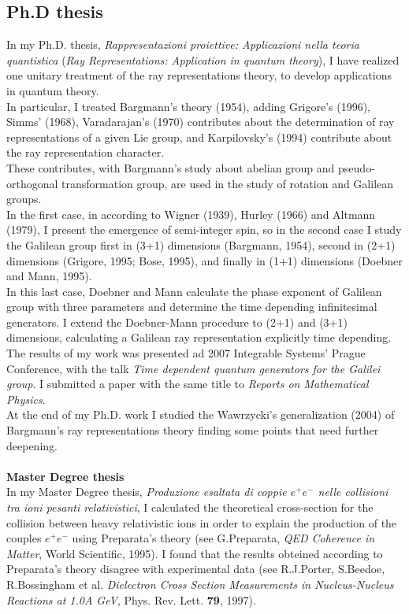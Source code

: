 \subsection*{Ph.D thesis}
In my Ph.D. thesis, {\em Rappresentazioni proiettive: Applicazioni nella teoria quantistica} ({\em Ray Representations: Application in quantum theory}), I have realized one unitary treatment of the ray representations theory, to develop applications in quantum theory.\\
In particular, I treated Bargmann's theory (1954), adding Grigore's (1996), Simms' (1968), Varadarajan's (1970) contributes about the determination of ray representations of a given Lie group, and Karpilovsky's (1994) contribute about the ray representation character.\\
These contributes, with Bargmann's study about abelian group and pseudo-orthogonal transformation group, are used in the study of rotation and Galilean groups.\\
In the first case, in according to Wigner (1939), Hurley (1966) and Altmann (1979), I present the emergence of semi-integer spin, so in the second case I study the Galilean group first in (3+1) dimensions (Bargmann, 1954), second in (2+1) dimensions (Grigore, 1995; Bose, 1995), and finally in (1+1) dimensions (Doebner and Mann, 1995).\\ 
In this last case, Doebner and Mann calculate the phase exponent of Galilean group with three parameters and determine the time depending infinitesimal generators. I extend the Doebner-Mann procedure to (2+1) and (3+1) dimensions, calculating a Galilean ray representation explicitly time depending.\\
The results of my work was presented ad 2007 Integrable Systems' Prague Conference, with the talk {\em Time dependent quantum generators for the Galilei group}. I submitted a paper with the same title to {\em Reports on Mathematical Physics}.\\
At the end of my Ph.D. work I studied the Wawrzycki's generalization (2004) of Bargmann's ray representations theory finding some points that need further deepening.\\\\
{\bf Master Degree thesis}\\
In my Master Degree thesis, {\em Produzione esaltata di coppie $e^+ e^-$ nelle collisioni tra ioni pesanti relativistici}, I calculated the theoretical cross-section for the collision between heavy relativistic ions in order to explain the production of the couples $e^+ e^-$ using Preparata's theory (see G.Preparata, {\em QED Coherence in Matter}, World Scientific, 1995). I found that the results obteined according to Preparata's theory disagree with experimental data (see R.J.Porter, S.Beedoe, R.Bossingham et al. {\em Dielectron Cross Section Measurements in Nucleus-Nucleus Reactions at 1.0A GeV}, Phys. Rev. Lett. {\bf 79}, 1997).\\\\
